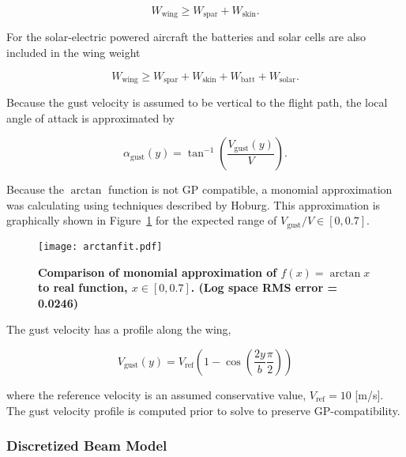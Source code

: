 \documentclass[]{aiaa-tc}%
\begin{document}
\begin{equation}
    W_{\text{wing}} \geq W_{\text{spar}} + W_{\text{skin}}.
\end{equation}

For the solar-electric powered aircraft the batteries and solar cells are also included in the wing weight

\begin{equation}
    W_{\text{wing}} \geq W_{\text{spar}} + W_{\text{skin}} + W_{\text{batt}} + W_{\text{solar}}.
\end{equation}

Because the gust velocity is assumed to be vertical to the flight path, the local angle of attack is approximated by 

\begin{equation}
    \label{e:gustalpha}
    \alpha_{\text{gust}}(y)  = \tan^{-1}\left(\frac{V_{\text{gust}}(y)}{V} \right).
\end{equation}

Because the $\arctan$ function is not GP compatible, a monomial approximation was calculating using techniques described by Hoburg\cite{fitting}.
This approximation is graphically shown in Figure~\ref{f:arctanfit} for the expected range of $V_{\text{gust}}/V \in [0, 0.7]$.  

\begin{figure}[H]
	\begin{center}
	\texttt{[image: arctanfit.pdf]}
    \caption{\textbf{Comparison of monomial approximation of $f(x) = \arctan{x}$ to real function, $x \in [0,0.7]$. (Log space RMS error = 0.0246)}}
	\label{f:arctanfit}
	\end{center}
\end{figure}

The gust velocity has a profile along the wing\cite{acgust},

\begin{equation}
    \label{e:gustwind}
    V_{\text{gust}}(y) = V_{\text{ref}} \left(1-\cos\left(\frac{2y}{b} \frac{\pi}{2} \right) \right)
\end{equation}

where the reference velocity is an assumed conservative value\cite{acgust}, $V_{\text{ref}} = 10$ [m/s]. The gust velocity profile is computed prior to solve to preserve GP-compatibility.

\subsubsection{Discretized Beam Model}
\end{document}
